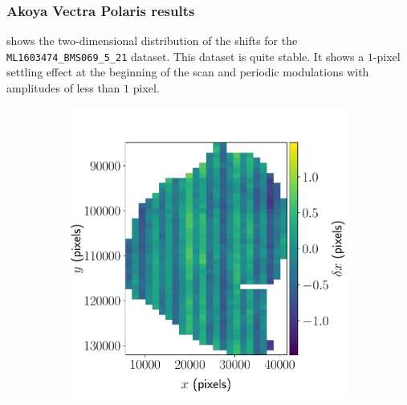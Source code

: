 \documentclass{article}
\begin{document}
\subsubsection{Akoya Vectra Polaris results}

 shows the two-dimensional distribution of the shifts for the \texttt{ML1603474\_BMS069\_5\_21} dataset.  This dataset is quite stable.   It shows a $1$-pixel settling effect at the beginning of the scan and periodic modulations with amplitudes of less than $1$ pixel.

\begin{figure}[ht]
	\centering
	\begin{subfigure}{0.49\linewidth}
		\includegraphics[width=\linewidth]{2D-shifts-AKY-x}
		\caption{}
		\label{fig:2DAKYx}
	\end{subfigure}
	\begin{subfigure}{0.49\linewidth}

\end{subfigure}
\end{figure}
\end{document}
